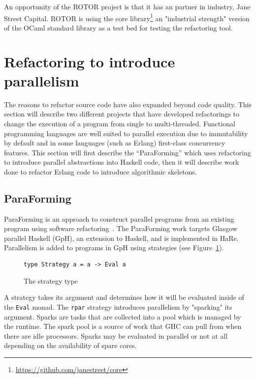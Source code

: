 An opportunity of the ROTOR project is that it has an partner in industry, Jane Street Capital. ROTOR is using the core library\footnote{\url{https://github.com/janestreet/core}} an "industrial strength" version of the OCaml standard library as a test bed for testing the refactoring tool.

\section{Refactoring to introduce parallelism}\label{refacParallel}

The reasons to refactor source code have also expanded beyond code quality. This section will describe two different projects that have developed refactorings to change the execution of a program from single to multi-threaded. Functional programming languages are well suited to parallel execution due to immutability by default and in some languages (such as Erlang) first-class concurrency features. This section will first describe the ``ParaForming'' which uses refactoring to introduce parallel abstractions into Haskell code, then it will describe work done to refactor Erlang code to introduce algorithmic skeletons.

\subsection{ParaForming}  
ParaForming is an approach to construct parallel programs from an existing program using software refactoring~\citep{paraforming}. The ParaForming work targets Glasgow parallel Haskell (GpH), an extension to Haskell, and is implemented in HaRe. Parallelism is added to programs in GpH using strategies (see Figure~\ref{strategy}). 

\begin{figure}[t]
\begin{lstlisting}
type Strategy a = a -> Eval a
\end{lstlisting}
\caption{The strategy type}
\label{strategy}
\end{figure}   

A strategy takes its argument and determines how it will be evaluated inside of the \texttt{Eval} monad. The \texttt{rpar} strategy introduces parallelism by "sparking" its argument. Sparks are tasks that are collected into a pool which is managed by the runtime. The spark pool is a source of work that GHC can pull from when there are idle processors. Sparks may be evaluated in parallel or not at all depending on the availability of spare cores.

